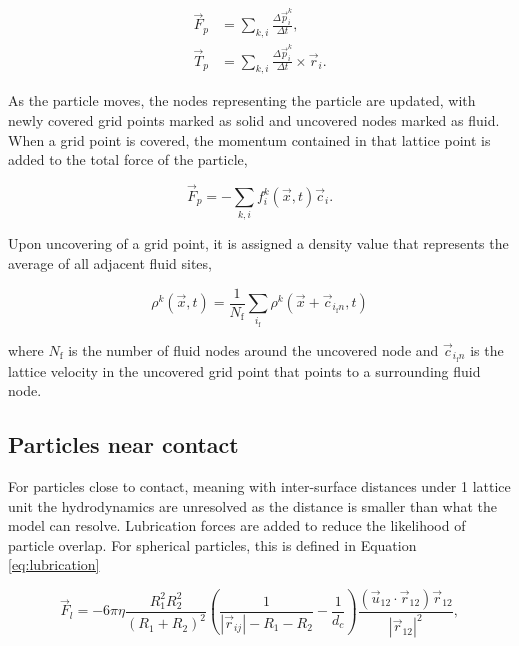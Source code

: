 \begin{equation}
    \begin{split}
    \vec{F}_p &= \sum_{k,i} \frac{\Delta \vec{p}^k_i}{\Delta t} , \\
    \vec{T}_p &= \sum_{k,i} \frac{\Delta\vec{p}^k_i}{\Delta t} \times \vec{r}_i .
    \end{split}
\end{equation}

As the particle moves, the nodes representing the particle are updated, with newly covered grid points marked as solid and 
uncovered nodes marked as fluid. When a grid point is covered, the momentum contained in that lattice point is added to the 
total force of the particle,

\begin{equation}
    \vec{F}_p = -\sum_{k,i} f_i^k(\vec{x},t)\vec{c}_i .
\end{equation}

Upon uncovering of a grid point, it is assigned a density value that represents the average of all adjacent fluid sites,

\begin{equation}
    \rho^k(\vec{x},t) = \frac{1}{N_{\text{f}}} \sum_{i_{\text{f}}} \rho^k(\vec{x}+\vec{c}_{i_{\text{f}}n}, t)
    \label{eq:fill_particles}
\end{equation}

where $N_{\text{f}}$ is the number of fluid nodes around the uncovered node and $\vec{c}_{i_{\text{f}}n}$ is the lattice velocity 
in the uncovered grid point that points to a surrounding fluid node.

\subsection{Particles near contact}
\label{section:particles_near_contact}

For particles close to contact, meaning with inter-surface distances under 1 lattice unit the hydrodynamics are unresolved as the
distance is smaller than what the model can resolve. Lubrication forces are added to reduce the likelihood of particle overlap. For 
spherical particles, this is defined in Equation \eqref{eq:lubrication}

\begin{equation}
    \vec{F}_l = -6 \pi \eta \frac{R_1^2 R_2^2}{\left(R_1+R_2\right)^2}\left(\frac{1}{|\vec{r}_{ij}|-R_1-R_2}-\frac{1}{d_c}\right) \frac{\left(\vec{u}_{12}\cdot\vec{r}_{12}\right)\vec{r}_{12}}{|\vec{r}_{12}|^2} ,%
    \label{eq:lubrication}
\end{equation}

